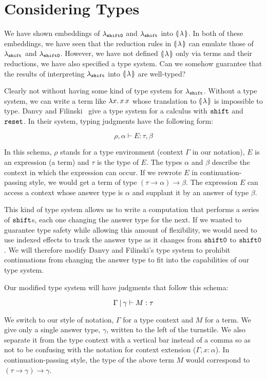 \section{Considering Types}

We have shown embeddings of $\lambda_{\mathtt{shift0}}$ and $\lambda_{\mathtt{shift}}$ into
$\llparenthesis \, \lambda \, \rrparenthesis$. In both of these embeddings, we have seen that the
reduction rules in $\llparenthesis \, \lambda \, \rrparenthesis$ can emulate those of $\lambda_{\mathtt{shift}}$
and $\lambda_{\mathtt{shift0}}$. However, we have not defined $\llparenthesis \, \lambda \, \rrparenthesis$ only
via terms and their reductions, we have also specified a type system. Can
we somehow guarantee that the results of interpreting $\lambda_{\mathtt{shift}}$ into
$\llparenthesis \, \lambda \, \rrparenthesis$ are well-typed?

Clearly not without having some kind of type system for
$\lambda_{\mathtt{shift}}$. Without a type system, we can write a term like
$\lambda x.\, x\,x$ whose translation to $\llparenthesis \, \lambda \, \rrparenthesis$ is impossible
to type. Danvy and Filinski~\cite{danvy1989functional} give a type system
for a calculus with $\mathtt{shift}$ and $\mathtt{reset}$. In their system, typing
judgments have the following form:

$$
\rho, \alpha \vdash E : \tau, \beta
$$

In this schema, $\rho$ stands for a type environment (context $\Gamma$ in
our notation), $E$ is an expression (a term) and $\tau$ is the type of
$E$. The types $\alpha$ and $\beta$ describe the context in which the
expression can occur. If we rewrote $E$ in continuation-passing style, we
would get a term of type $(\tau \to \alpha) \to \beta$. The expression $E$
can access a context whose answer type is $\alpha$ and supplant it by an
answer of type $\beta$.

This kind of type system allows us to write a computation that performs a
series of $\mathtt{shift}$s, each one changing the answer type for the next. If we
wanted to guarantee type safety while allowing this amount of flexibility,
we would need to use indexed effects \cite{andjelkovic2014towards} to track
the answer type as it changes from $\mathtt{shift0}$ to $\mathtt{shift0}$. We will
therefore modify Danvy and Filinski's type system to prohibit continuations
from changing the answer type to fit into the capabilities of our type
system.

Our modified type system will have judgments that follow this schema:

$$
\Gamma \mathbin{|} \gamma \vdash M : \tau
$$

We switch to our style of notation, $\Gamma$ for a type context and $M$ for
a term. We give only a single answer type, $\gamma$, written to the left of
the turnstile. We also separate it from the type context with a vertical
bar instead of a comma so as not to be confusing with the notation for
context extension ($\Gamma, x : \alpha$). In continuation-passing style,
the type of the above term $M$ would correspond to $(\tau \to \gamma) \to
\gamma$.

